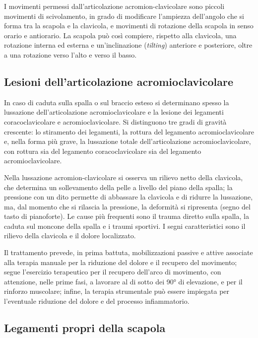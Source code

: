 I movimenti permessi dall'articolazione acromion-clavicolare sono
piccoli movimenti di scivolamento, in grado di modificare l'ampiezza
dell'angolo che si forma tra la scapola e la clavicola, e movimenti di
rotazione della scapola in senso orario e antiorario. La scapola può così
compiere, rispetto alla clavicola, una rotazione interna ed esterna e
un'inclinazione (\textit{tilting}) anteriore e posteriore, oltre a una
rotazione verso l'alto e verso il basso.

\subsection{Lesioni dell'articolazione acromioclavicolare}

In caso di caduta sulla spalla o sul braccio esteso si determinano spesso
la lussazione dell'articolazione acromioclavicolare e la lesione dei
legamenti coracoclavicolare e acromioclavicolare. Si distinguono tre
gradi di gravità crescente: lo stiramento dei legamenti, la rottura del
legamento acromioclavicolare e, nella forma più grave, la lussazione
totale dell'articolazione acromioclavicolare, con rottura sia del
legamento coracoclavicolare sia del legamento acromioclavicolare.

Nella lussazione acromion-clavicolare si osserva un rilievo netto della
clavicola, che determina un sollevamento della pelle a livello del piano
della spalla; la pressione con un dito permette di abbassare la clavicola
e di ridurre la lussazione, ma, dal momento che si rilascia la pressione,
la deformità si ripresenta (segno del tasto di pianoforte). Le cause più
frequenti sono il trauma diretto sulla spalla, la caduta sul moncone della
spalla e i traumi sportivi. I segni caratteristici sono il rilievo della
clavicola e il dolore localizzato.

Il trattamento prevede, in prima battuta, mobilizzazioni passive e
attive associate alla terapia manuale per la riduzione del dolore e il
recupero del movimento; segue l'esercizio terapeutico per il recupero
dell'arco di movimento, con attenzione, nelle prime fasi, a lavorare al di
sotto dei 90° di elevazione, e per il rinforzo muscolare; infine, la
terapia strumentale può essere impiegata per l'eventuale riduzione del
dolore e del processo infiammatorio.

\subsection{Legamenti propri della scapola}


